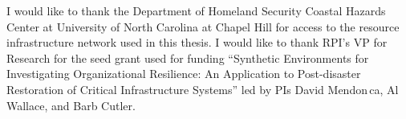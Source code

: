  
I would like to thank the Department of Homeland Security Coastal Hazards Center at University of North Carolina at Chapel Hill for access to the resource infrastructure network used in this thesis. I would like to thank RPI's VP for Research for the seed grant used for funding ``Synthetic Environments for Investigating Organizational Resilience: An Application to Post-disaster Restoration of Critical Infrastructure Systems'' led by PIs David Mendon\,{c}a, Al Wallace, and Barb Cutler.
